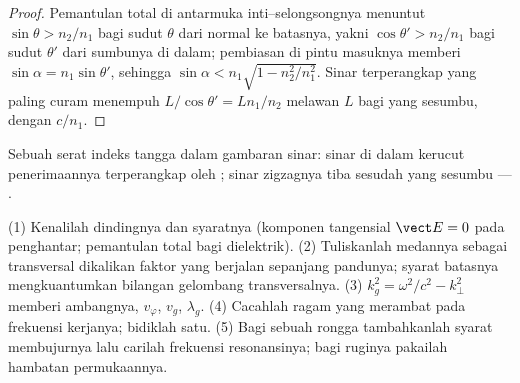 \begin{proof}
Pemantulan total di antarmuka inti--selongsongnya menuntut $\sin\theta >
n_2/n_1$ bagi sudut $\theta$ dari normal ke batasnya, yakni $\cos
\theta' > n_2/n_1$ bagi sudut $\theta'$ dari sumbunya di dalam; pembiasan
di pintu masuknya memberi $\sin\alpha = n_1\sin\theta'$, sehingga $\sin\alpha < n_1\sqrt{1
- n_2^2/n_1^2}$. Sinar terperangkap yang paling curam menempuh $L/\cos\theta' = Ln_1/n_2$
melawan $L$ bagi yang sesumbu, dengan $c/n_1$.
\end{proof}

\begin{omfigure}

{\small Sebuah serat indeks tangga dalam gambaran sinar: sinar di dalam
kerucut penerimaannya terperangkap oleh ; sinar
zigzagnya tiba sesudah yang sesumbu --- .}
\end{omfigure}

\begin{method}\label{met:b2:guided-waves:method}
(1) Kenalilah dindingnya dan syaratnya (komponen tangensial $\vect E = 0$ pada
penghantar; pemantulan total bagi dielektrik). (2) Tuliskanlah medannya
sebagai  transversal dikalikan faktor yang berjalan sepanjang
pandunya; syarat batasnya mengkuantumkan bilangan gelombang transversalnya.
(3)  $k_g^2 = \omega^2/c^2 - k_\perp^2$ memberi
ambangnya, $v_\varphi$, $v_g$, $\lambda_g$. (4) Cacahlah ragam yang merambat pada
frekuensi kerjanya; bidiklah satu. (5) Bagi sebuah rongga tambahkanlah syarat
membujurnya lalu carilah frekuensi resonansinya; bagi ruginya pakailah
hambatan permukaannya.
\end{method}

